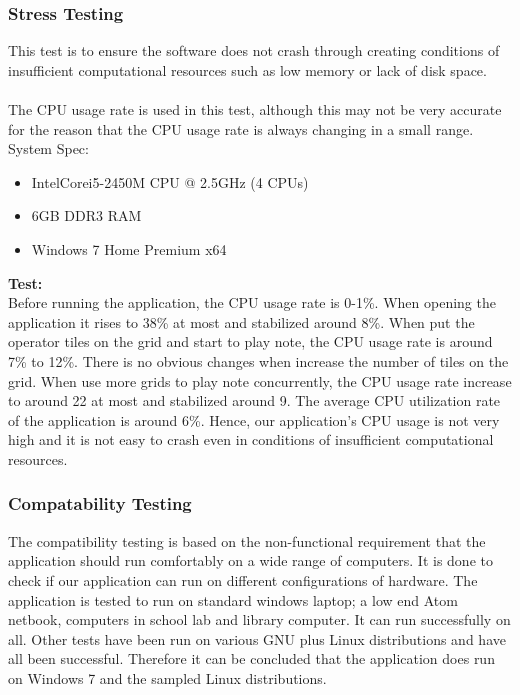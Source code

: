 \documentclass[10pt,a4paper]{article}
\begin{document}
\subsubsection{Stress Testing}
This test is to ensure the software does not crash through creating conditions of insufficient computational resources such as low memory or lack of disk space.\\
\\
The CPU usage rate is used in this test, although this may not be very accurate for the reason that the CPU usage rate is always changing in a small range.\\
\pagebreak
System Spec:
\begin{itemize}
\item Intel\textregistered Core\texttrademark i5-2450M CPU @ 2.5GHz (4 CPUs)
\item 6GB DDR3 RAM
\item Windows 7 Home Premium x64
\end{itemize}
\textbf{Test:} \\
Before running the application, the CPU usage rate is 0-1\%. When opening the application it rises to 38\% at most and stabilized around 8\%. When put the operator tiles on the grid and start to play note, the CPU usage rate is around 7\% to 12\%. There is no obvious changes when increase the number of tiles on the grid. When use more grids to play note concurrently, the CPU usage rate increase to around 22 at most and stabilized around 9. The average CPU utilization rate of the application is around 6\%. Hence, our application’s CPU usage is not very high and it is not easy to crash even in conditions of insufficient computational resources. 

\subsubsection{Compatability Testing}
The compatibility testing is based on the non-functional requirement that the application should run comfortably on a wide range of computers. It is done to check if our application can run on different configurations of hardware. The application is tested to run on standard windows laptop; a low end Atom netbook, computers in school lab and library computer. It can run successfully on all. Other tests have been run on various GNU plus Linux distributions and have all been successful. Therefore it can be concluded that the application does run on Windows 7 and the sampled Linux distributions.\\
\end{document}
